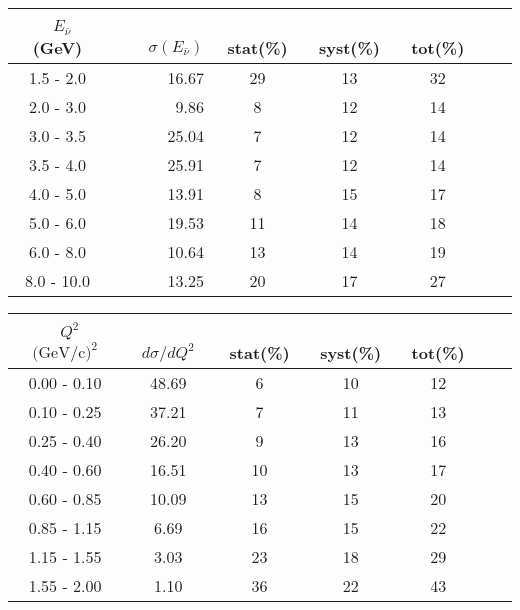 \documentclass[aps, prd, reprint,showpacs,  preprintnumbers,amsmath,amssymb,superscriptaddress, nofootinbib]{revtex4-1}
\makeatletter
\newcommand{\anu}{\ensuremath{\bar{\nu}}}
\renewenvironment{table}
  {\def\@captype{table}}
  {}
\makeatother
\begin{document}
\begin{table}
\centering
\begin{tabular}{crccccc}
\hline
~$E_{\anu}$ (GeV) &~~~ $\sigma (E_{\anu})$ &~ stat(\%) &~ syst(\%) &~ tot(\%)  \\
\hline
  1.5 -   2.0 &  16.67 & 29 & 13 & 32 \\ 
  2.0 -   3.0 &   9.86 & 8 & 12 & 14 \\ 
  3.0 -   3.5 &  25.04 & 7 & 12 & 14 \\ 
  3.5 -   4.0 &  25.91 & 7 & 12 & 14 \\ 
  4.0 -   5.0 &  13.91 & 8 & 15 & 17 \\ 
  5.0 -   6.0 &  19.53 & 11 & 14 & 18 \\ 
  6.0 -   8.0 &  10.64 & 13 & 14 & 19 \\ 
  8.0 -  10.0 &  13.25 & 20 & 17 & 27 \\ 
\hline
\hline
\end{tabular}
\caption{ Total cross section in neutrino energy $E_{\anu}$, $\sigma (E_{\anu})(10^{-40}\text{cm}^2/\text{nucleon})$, 
for $\pi^-$+nucleon(s) production with statistical (stat), systematic (syst), and total (tot) uncertainties.}
\label{tb:sigma-Enu}
\end{table}

\onecolumngrid
\newpage
\noindent

\begin{table}
\centering
\begin{tabular}{ccccccc}
\hline
~$Q^2$ $\text{(GeV/c)}^2$ &~~ $d\sigma/dQ^2$ &~ stat(\%) &~ syst(\%) &~ tot(\%)  \\
\hline
 0.00 -  0.10 &  48.69 & 6 & 10 & 12 \\ 
 0.10 -  0.25 &  37.21 & 7 & 11 & 13 \\ 
 0.25 -  0.40 &  26.20 & 9 & 13 & 16 \\ 
 0.40 -  0.60 &  16.51 & 10 & 13 & 17 \\ 
 0.60 -  0.85 &  10.09 & 13 & 15 & 20 \\ 
 0.85 -  1.15 &   6.69 & 16 & 15 & 22 \\ 
 1.15 -  1.55 &   3.03 & 23 & 18 & 29 \\ 
 1.55 -  2.00 &   1.10 & 36 & 22 & 43 \\ 
\hline
\hline
\end{tabular}
\caption{ Flux-averaged differential cross section in $Q^2$, 
$d\sigma/dQ^2 (10^{-40}\text{cm}^2/\text{nucleon}/(\text{GeV/c})^2)$, 
for $\pi^-$+nucleon(s) production with statistical (stat), systematic (syst), and total (tot) uncertainties.}
\label{tb:piz-Q2}
\end{table}
\smallskip
\smallskip
\smallskip
\smallskip
\end{document}
